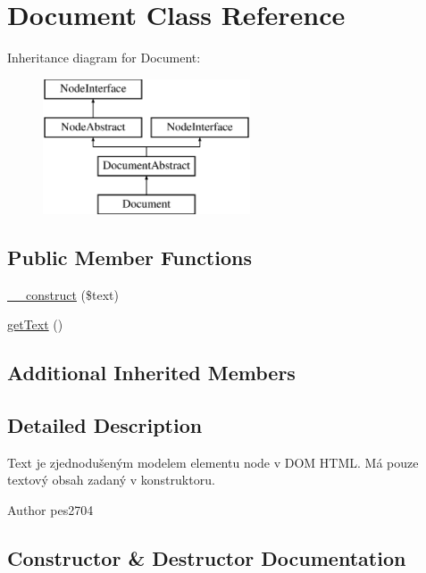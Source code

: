 \hypertarget{class_pes_1_1_dom_1_1_node_1_1_document_1_1_document}{}\section{Document Class Reference}
\label{class_pes_1_1_dom_1_1_node_1_1_document_1_1_document}
Inheritance diagram for Document\+:\begin{figure}[H]
\begin{center}
\leavevmode
\includegraphics[height=4.000000cm]{class_pes_1_1_dom_1_1_node_1_1_document_1_1_document}
\end{center}
\end{figure}
\subsection*{Public Member Functions}
\begin{DoxyCompactItemize}
\item 
\mbox{\hyperlink{class_pes_1_1_dom_1_1_node_1_1_document_1_1_document_a29f6e9abaa4fb1c43e6a790fbe681bb9}{\+\_\+\+\_\+construct}} (\$text)
\item 
\mbox{\hyperlink{class_pes_1_1_dom_1_1_node_1_1_document_1_1_document_a8a2999b1d846c0a7bc77187e28facd99}{get\+Text}} ()
\end{DoxyCompactItemize}
\subsection*{Additional Inherited Members}


\subsection{Detailed Description}
Text je zjednodušeným modelem elementu node v D\+OM H\+T\+ML. Má pouze textový obsah zadaný v konstruktoru.

\begin{DoxyAuthor}{Author}
pes2704 
\end{DoxyAuthor}


\subsection{Constructor \& Destructor Documentation}
\mbox{\label{class_pes_1_1_dom_1_1_node_1_1_document_1_1_document_a29f6e9abaa4fb1c43e6a790fbe681bb9}} 
